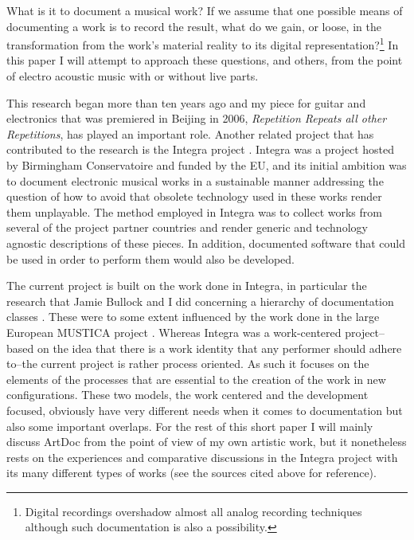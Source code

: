 \documentclass[runningheads,a4paper]{llncs}
\begin{document}
What is it to document a musical work? If we assume that one possible means of documenting a work is to record the result, what do we gain, or loose, in the transformation from the work's material reality to its digital representation?\footnote{Digital recordings overshadow almost all analog recording techniques although such documentation is also a possibility.} In this paper I will attempt to approach these questions, and others, from the point of electro acoustic music with or without live parts. 

This research began more than ten years ago and my piece for guitar and electronics that was premiered in Beijing in 2006, \emph{Repetition Repeats all other Repetitions}, has played an important role. Another related project that has contributed to the research is the Integra project \cite{integra}. Integra was a project hosted by Birmingham Conservatoire and funded by the EU, and its initial ambition was to document electronic musical works in a sustainable manner addressing the question of how to avoid that obsolete technology used in these works render them unplayable. \cite{frisk-bullock08,frisk-bull07,bullock06} The method employed in Integra was to collect works from several of the project partner countries and render generic and technology agnostic descriptions of these pieces. In addition, documented software that could be used in order to perform them would also be developed.

The current project is built on the work done in Integra, in particular the research that Jamie Bullock and I did concerning a hierarchy of documentation classes \cite{frisk09,frisk-bullock08}. These were to some extent influenced by the work done in the large European MUSTICA project \cite{bachimont03}. Whereas Integra was a work-centered project--based on the idea that there is a work identity that any performer should adhere to--the current project is rather process oriented. As such it focuses on the elements of the processes that are essential to the creation of the work in new configurations. These two models, the work centered and the development focused, obviously have very different needs when it comes to documentation but also some important overlaps. For the rest of this short paper I will mainly discuss ArtDoc from the point of view of my own artistic work, but it nonetheless rests on the experiences and comparative discussions in the Integra project with its many different types of works (see the sources cited above for reference).
\end{document}

